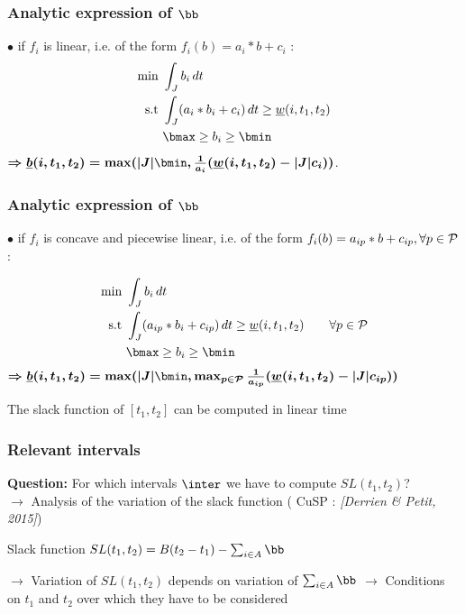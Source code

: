 \begin{frame}
  \frametitle{Analytic expression of $\bb$}
  \vfill
  $\bullet$ if $f_i$ is linear, i.e. of the form $f_i(b)= a_i*b+c_i$ :
\pause
    \begin{align*}
      \text{min }  & \int_{J} b_i\,dt  \\
      \text{s.t } & \int_{J}(a_i*b_i+c_i)\,dt \ge
                    \underline{w}(i,t_1,t_2)\\
                   & \bmax \ge b_i \ge \bmin
    \end{align*}
\pause
  { \color{blue!80!black!80}
    $\boldmath{\Rightarrow  \underline{b}(i,t_1,t_2)= \max ( |J|\bmin, \frac{1}{a_i}( \underline{w}(i,t_1,t_2)-|J|c_i))}$}.
 
\end{frame}

\begin{frame}
  \frametitle{Analytic expression of $\bb$}
  \vfill
  $\bullet$  if $f_i$ is concave and piecewise linear, i.e. of the form
  $f_i(b)=a_{ip}*b+c_{ip}, \forall p \in {\cal P}$:
\pause

    \begin{align*}
      \text{min }  & \int_{J} b_i\,dt  \\
      \text{s.t } & \int_{J}(a_{ip}*b_i+c_{ip})\,dt \ge
                    \underline{w}(i,t_1,t_2) \qquad \forall p \in
                    {\cal P}\\
                   & \bmax \ge b_i \ge \bmin
    \end{align*}
\pause
  { \color{blue!80!black!80}
    $\boldmath{\Rightarrow  \underline{b}(i,t_1,t_2)= \max ( |J|\bmin, \max_{p
        \in {\cal P}} \frac{1}{a_{ip}}( \underline{w}(i,t_1,t_2)-|J|c_{ip}))}$}
  \vfill
\begin{prop}
The slack function of $[t_1,t_2]$ can be computed in linear time
\end{prop}
\end{frame}


\begin{frame}
  \frametitle{Relevant intervals}
  {\bf Question: } For which intervals $\inter$ we have to compute $SL(t_1,t_2)$?\\
  \vfill
\pause
  $\rightarrow$ Analysis of the variation of the slack function (
   {\small CuSP : \it \color{gray!50!black!50} [Derrien \& Petit, 2015]})\\
  \vfill
\pause
  \begin{block}{Slack function}
    \centering $SL(t_1,t_2)=B(t_2-t_1) - \sum_{i \in A} \bb$
  \end{block}
\pause
\vspace{0.8cm}
$\rightarrow$ Variation of $SL(t_1,t_2)$ depends on variation of 
$\sum_{i \in A} \bb$
\vfill 
\pause
$\rightarrow$ Conditions on $t_1$ and $t_2$ over which they have to be
considered 
\vfill 
\end{frame}

